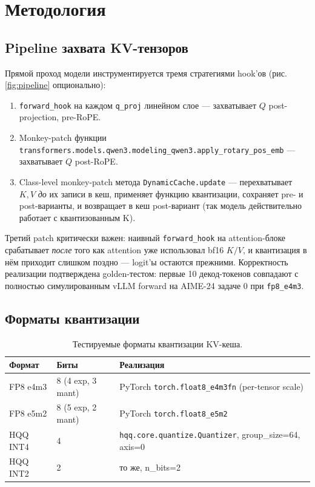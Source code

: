 \documentclass[a4paper,12pt]{article}
\begin{document}
\section{Методология}

\subsection{Pipeline захвата KV-тензоров}

Прямой проход модели инструментируется тремя стратегиями hook'ов (рис. \ref{fig:pipeline} опционально):
\begin{enumerate}[label=\arabic*.,leftmargin=*]
\item \texttt{forward\_hook} на каждом \texttt{q\_proj} линейном слое --- захватывает $Q$ post-projection, pre-RoPE.
\item Monkey-patch функции \texttt{transformers.models.qwen3.modeling\_qwen3.apply\_rotary\_pos\_emb} --- захватывает $Q$ post-RoPE.
\item Class-level monkey-patch метода \texttt{DynamicCache.update} --- перехватывает $K, V$ \textit{до} их записи в кеш, применяет функцию квантизации, сохраняет pre- и post-варианты, и возвращает в кеш post-вариант (так модель действительно работает с квантизованным K).
\end{enumerate}

Третий patch критически важен: наивный \texttt{forward\_hook} на attention-блоке срабатывает \textit{после} того как attention уже использовал bf16 $K/V$, и квантизация в нём приходит слишком поздно --- logit'ы остаются прежними. Корректность реализации подтверждена golden-тестом: первые 10 декод-токенов совпадают с полностью симулированным vLLM forward на AIME-24 задаче 0 при \texttt{fp8\_e4m3}.

\subsection{Форматы квантизации}

\begin{table}[H]
\centering
\caption{Тестируемые форматы квантизации KV-кеша.}
\begin{tabular}{lll}
\toprule
Формат & Биты & Реализация \\
\midrule
FP8 e4m3 & 8 (4 exp, 3 mant) & PyTorch \texttt{torch.float8\_e4m3fn} (per-tensor scale) \\
FP8 e5m2 & 8 (5 exp, 2 mant) & PyTorch \texttt{torch.float8\_e5m2} \\
HQQ INT4 & 4 & \texttt{hqq.core.quantize.Quantizer}, group\_size=64, axis=0 \\
HQQ INT2 & 2 & то же, n\_bits=2 \\
\bottomrule
\end{tabular}
\end{table}
\end{document}
